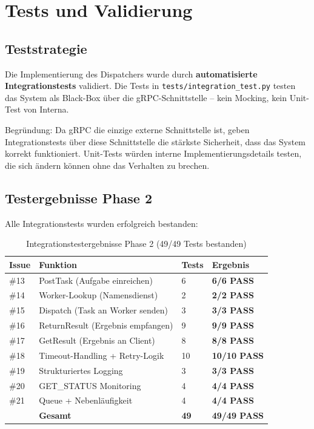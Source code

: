 \section{Tests und Validierung}
\label{sec:tests}

\subsection{Teststrategie}

Die Implementierung des Dispatchers wurde
durch \textbf{automatisierte Integrationstests} validiert.
Die Tests in \texttt{tests/integration\_test.py} testen das System
als Black-Box über die gRPC-Schnittstelle -- kein Mocking,
kein Unit-Test von Interna.

\noindent Begründung: Da gRPC die einzige externe Schnittstelle ist, geben
Integrationstests über diese Schnittstelle die stärkste
Sicherheit, dass das System korrekt funktioniert.
Unit-Tests würden interne Implementierungsdetails testen,
die sich ändern können ohne das Verhalten zu brechen.

\subsection{Testergebnisse Phase 2}

Alle Integrationstests wurden erfolgreich bestanden:

\begin{table}[H]
\centering
\begin{tabular}{llll}
\toprule
\textbf{Issue} & \textbf{Funktion} & \textbf{Tests} & \textbf{Ergebnis} \\
\midrule
\#13 & PostTask (Aufgabe einreichen)            & 6  & \textbf{6/6 PASS} \\
\#14 & Worker-Lookup (Namensdienst)             & 2  & \textbf{2/2 PASS} \\
\#15 & Dispatch (Task an Worker senden)         & 3  & \textbf{3/3 PASS} \\
\#16 & ReturnResult (Ergebnis empfangen)        & 9  & \textbf{9/9 PASS} \\
\#17 & GetResult (Ergebnis an Client)           & 8  & \textbf{8/8 PASS} \\
\#18 & Timeout-Handling + Retry-Logik           & 10 & \textbf{10/10 PASS} \\
\#19 & Strukturiertes Logging                   & 3  & \textbf{3/3 PASS} \\
\#20 & GET\_STATUS Monitoring                   & 4  & \textbf{4/4 PASS} \\
\#21 & Queue + Nebenläufigkeit                  & 4  & \textbf{4/4 PASS} \\
\midrule
     & \textbf{Gesamt}                          & \textbf{49} & \textbf{49/49 PASS} \\
\bottomrule
\end{tabular}
\caption{Integrationstestergebnisse Phase 2 (49/49 Tests bestanden)}
\end{table}

